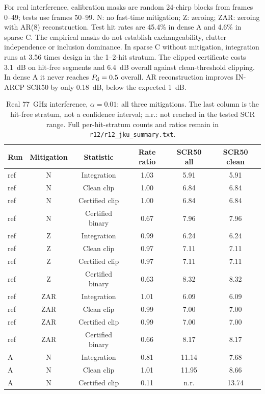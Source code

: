 \documentclass[10pt]{article}
\begin{document}
For real interference, calibration masks are random 24-chirp blocks from frames 0--49; tests use frames 50--99. N: no fast-time mitigation; Z: zeroing; ZAR: zeroing with AR(8) reconstruction. Test hit rates are 45.4\% in dense A and 4.6\% in sparse C. The empirical masks do not establish exchangeability, clutter independence or inclusion dominance. In sparse C without mitigation, integration runs at 3.56 times design in the 1--2-hit stratum. The clipped certificate costs 3.1~dB on hit-free segments and 6.4~dB overall against clean-threshold clipping. In dense A it never reaches $P_{\rm d}=0.5$ overall. AR reconstruction improves IN-ARCP SCR50 by only 0.18~dB, below the expected 1~dB.


\begin{table}[htbp]
\centering\small\setlength{\tabcolsep}{4pt}
\caption{Real 77~GHz interference, $\alpha=0.01$: all three mitigations. The last column is the hit-free stratum, not a confidence interval; n.r.: not reached in the tested SCR range. Full per-hit-stratum counts and ratios remain in \texttt{r12/r12\_jku\_summary.txt}.}\label{tab:jku_interference}
\begin{tabular}{lccccc}
\toprule
Run & Mitigation & Statistic & Rate ratio & SCR50 all & SCR50 clean \\
\midrule
ref & N & Integration & 1.03 & 5.91 & 5.91 \\
ref & N & Clean clip & 1.00 & 6.84 & 6.84 \\
ref & N & Certified clip & 1.00 & 6.84 & 6.84 \\
ref & N & Certified binary & 0.67 & 7.96 & 7.96 \\
ref & Z & Integration & 0.99 & 6.24 & 6.24 \\
ref & Z & Clean clip & 0.97 & 7.11 & 7.11 \\
ref & Z & Certified clip & 0.97 & 7.11 & 7.11 \\
ref & Z & Certified binary & 0.63 & 8.32 & 8.32 \\
ref & ZAR & Integration & 1.01 & 6.09 & 6.09 \\
ref & ZAR & Clean clip & 0.99 & 7.00 & 7.00 \\
ref & ZAR & Certified clip & 0.99 & 7.00 & 7.00 \\
ref & ZAR & Certified binary & 0.66 & 8.17 & 8.17 \\
A & N & Integration & 0.81 & 11.14 & 7.68 \\
A & N & Clean clip & 1.01 & 11.95 & 8.66 \\
A & N & Certified clip & 0.11 & n.r. & 13.74 \\

\end{tabular}
\end{table}
\end{document}

